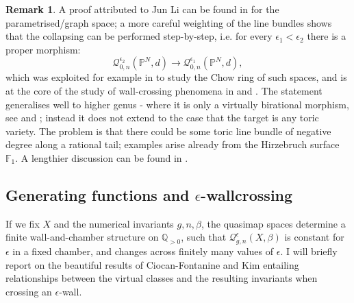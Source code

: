 \documentclass[11pt]{amsart}
\newcommand{\Qe}[4]{\mathcal{Q}^{\epsilon}_{#1,#2}(#3,#4)}
\newcommand{\PP}{\mathbb P}
\newcommand{\QQ}{\mathbb{Q}}
\renewcommand{\to}{\rightarrow}
\theoremstyle{definition}
\theoremstyle{definition}
\newtheorem{rmk}[thm]{Remark}
\begin{document}
\begin{rmk}
 A proof attributed to Jun Li can be found in \cite[Lemma 2.6]{LLY1} for the parametrised/graph space; a more careful weighting of the line bundles shows that the collapsing can be performed step-by-step, i.e. for every $\epsilon_1<\epsilon_2$ there is a proper morphism:
 \[ \mathcal{Q}^{\epsilon_2}_{0,n}(\PP^N,d) \to \mathcal{Q}^{\epsilon_1}_{0,n}(\PP^N,d),\] which was exploited for example in \cite{Mustata} to study the Chow ring of such spaces, and is at the core of the study of wall-crossing phenomena in \cite{TodaStableQuotient} and \cite{CF-K-wallcrossing}. The statement generalises well to higher genus - where it is only a virtually birational morphism, see \cite[Theorem 3]{MOP} and \cite[Proposition 4.21]{Manolache-Push}; instead it does not extend to the case that the target is any toric variety. The problem is that there could be some toric line bundle of negative degree along a rational tail; examples arise already from the Hirzebruch surface $\mathbb F_1$. A lengthier discussion can be found in \cite[Appendix A]{BN}.
\end{rmk}

\subsection{Generating functions and $\epsilon$-wallcrossing}\label{subsec:gf_and_wc} If we fix $X$ and the numerical invariants $g,n,\beta$, the quasimap spaces determine a finite wall-and-chamber structure on $\QQ_{>0}$, such that $\Qe{g}{n}{X}{\beta}$ is constant for $\epsilon$ in a fixed chamber, and changes across finitely many values of $\epsilon$. I will briefly report on the beautiful results of Ciocan-Fontanine and Kim \cite{CF-K-wallcrossing,CF-K-higher-genus,CF-K-MirrorSymmetry} entailing relationships between the virtual classes and the resulting invariants when crossing an $\epsilon$-wall.
\end{document}
